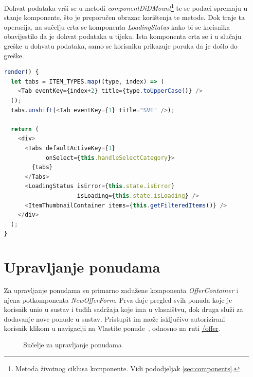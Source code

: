 \documentclass[times, utf8, zavrsni, numeric]{fer}
\newcommand{\razmakp}{\vspace{18pt}}
\newcommand{\razmaks}{\vspace{10pt}}
\begin{document}
Dohvat podataka vrši se u metodi \emph{componentDiDMount}\footnote{Metoda životnog ciklusa komponente. Vidi pododjeljak \ref{sec:components}.} te se podaci spremaju u stanje komponente, što je preporučen obrazac korištenja te metode\citep{reactDocsComponent}.
Dok traje ta operacija, na sučelju crta se komponenta \emph{LoadingStatus} kako bi se korisnika obavijestilo da je dohvat podataka u tijeku.
Ista komponenta crta se i u slučaju greške u dohvatu podataka, samo se korisniku prikazuje poruka da je došlo do greške.

\razmakp
\begin{lstlisting}[language=JavaScript, caption={Metoda \emph{render} komponente \emph{Main}}, label={lst:main_render}]
render() {
  let tabs = ITEM_TYPES.map((type, index) => (
    <Tab eventKey={index+2} title={type.toUpperCase()} />
  ));
  tabs.unshift(<Tab eventKey={1} title="SVE" />);

  return (
    <div>
      <Tabs defaultActiveKey={1}
            onSelect={this.handleSelectCategory}>
        {tabs}
      </Tabs>
      <LoadingStatus isError={this.state.isError}
                     isLoading={this.state.isLoading} />
      <ItemThumbnailContainer items={this.getFilteredItems()} />
    </div>
  );
}
\end{lstlisting}
\razmaks

\newpage


\section{Upravljanje ponudama}

Za upravljanje ponudama su primarno zadužene komponenta \emph{OfferContainer} i njena potkomponenta \emph{NewOfferForm}.
Prva daje pregled svih ponuda koje je korisnik unio u sustav i tuđih sadržaja koje ima u vlasništvu, dok druga služi za dodavanje nove ponude u sustav.
Pristupit im može isključivo autorizirani korisnik klikom u navigaciji na \glqq Vlastite ponude\grqq ~, odnosno na ruti \glqq \url{/offer}\grqq .

\razmaks

\begin{figure}[htb]
\centering
{}
\caption{Sučelje za upravljanje ponudama}
\label{fig:screenshot-main}
\end{figure}
\end{document}
